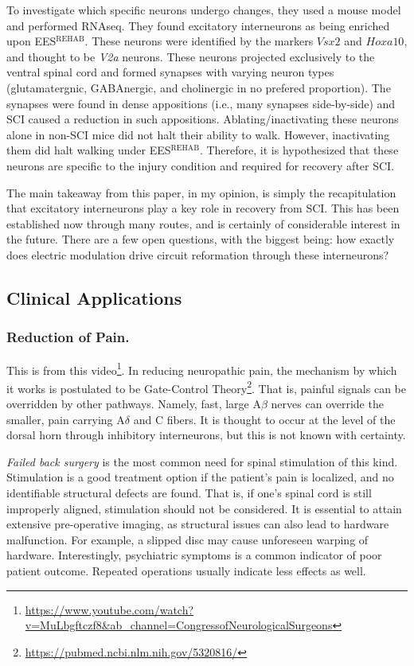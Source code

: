 \documentclass[12pt]{report}
\begin{document}
To investigate which specific neurons undergo changes, they used a mouse model and performed RNAseq. They found excitatory interneurons as being enriched upon EES$^{\mathrm{REHAB}}$. These neurons were identified by the markers $Vsx2$ and $Hoxa10$, and thought to be \textit{V2a} neurons. These neurons projected exclusively to the ventral spinal cord and formed synapses with varying neuron types (glutamatergnic, GABAnergic, and cholinergic in no prefered proportion). The synapses were found in dense appositions (i.e., many synapses side-by-side) and SCI caused a reduction in such appositions. Ablating/inactivating these neurons alone in non-SCI mice did not halt their ability to walk. However, inactivating them did halt walking under EES$^{\mathrm{REHAB}}$. Therefore, it is hypothesized that these neurons are specific to the injury condition and required for recovery after SCI.\newline

The main takeaway from this paper, in my opinion, is simply the recapitulation that excitatory interneurons play a key role in recovery from SCI. This has been established now through many routes, and is certainly of considerable interest in the future. There are a few open questions, with the biggest being: how exactly does electric modulation drive circuit reformation through these interneurons? 

\subsection{Clinical Applications}

\subsubsection{Reduction of Pain.}
This is from this video\footnote{\url{https://www.youtube.com/watch?v=MuLbgftczf8\&ab_channel=CongressofNeurologicalSurgeons}}. In reducing neuropathic pain, the mechanism by which it works is postulated to be Gate-Control Theory\footnote{\url{https://pubmed.ncbi.nlm.nih.gov/5320816/}}. That is, painful signals can be overridden by other pathways. Namely, fast, large A$\beta$ nerves can override the smaller, pain carrying A$\delta$ and C fibers. It is thought to occur at the level of the dorsal horn through inhibitory interneurons, but this is not known with certainty.\newline

\textit{Failed back surgery} is the most common need for spinal stimulation of this kind. Stimulation is a good treatment option if the patient's pain is localized, and no identifiable structural defects are found. That is, if one's spinal cord is still improperly aligned, stimulation should not be considered. It is essential to attain extensive pre-operative imaging, as structural issues can also lead to hardware malfunction. For example, a slipped disc may cause unforeseen warping of hardware. Interestingly, psychiatric symptoms is a common indicator of poor patient outcome. Repeated operations usually indicate less effects as well.\newline
\end{document}
